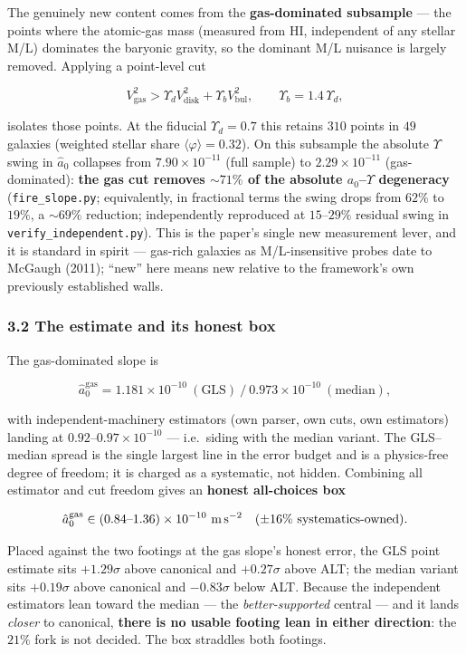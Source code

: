 \documentclass[
]{article}
\begin{document}
The genuinely new content comes from the \textbf{gas-dominated
subsample} --- the points where the atomic-gas mass (measured from HI,
independent of any stellar M/L) dominates the baryonic gravity, so the
dominant M/L nuisance is largely removed. Applying a point-level cut

\[V_\mathrm{gas}^2 > \Upsilon_d V_\mathrm{disk}^2 + \Upsilon_b V_\mathrm{bul}^2,\qquad \Upsilon_b=1.4\,\Upsilon_d,\]

isolates those points. At the fiducial \(\Upsilon_d=0.7\) this retains
\(310\) points in \(49\) galaxies (weighted stellar share
\(\langle\varphi\rangle=0.32\)). On this subsample the absolute
\(\Upsilon\) swing in \(\hat a_0\) collapses from \(7.90\times10^{-11}\)
(full sample) to \(2.29\times10^{-11}\) (gas-dominated): \textbf{the gas
cut removes \(\sim71\%\) of the absolute \(a_0\)--\(\Upsilon\)
degeneracy} (\texttt{fire\_slope.py}; equivalently, in fractional terms
the swing drops from \(62\%\) to \(19\%\), a \(\sim69\%\) reduction;
independently reproduced at \(15\)--\(29\%\) residual swing in
\texttt{verify\_independent.py}). This is the paper's single new
measurement lever, and it is standard in spirit --- gas-rich galaxies as
M/L-insensitive probes date to McGaugh (2011); ``new'' here means new
relative to the framework's own previously established walls.

\subsubsection{3.2 The estimate and its honest
box}\label{the-estimate-and-its-honest-box}

The gas-dominated slope is

\[\hat a_0^\mathrm{gas}=1.181\times10^{-10}\ (\text{GLS})\ /\ 0.973\times10^{-10}\ (\text{median}),\]

with independent-machinery estimators (own parser, own cuts, own
estimators) landing at \(0.92\)--\(0.97\times10^{-10}\) --- i.e.~siding
with the median variant. The GLS--median spread is the single largest
line in the error budget and is a physics-free degree of freedom; it is
charged as a systematic, not hidden. Combining all estimator and cut
freedom gives an \textbf{honest all-choices box}

\[\hat a_0^\mathrm{gas}\in(0.84\text{–}1.36)\times10^{-10}\ {\rm m\,s^{-2}}\quad(\pm16\%\ \text{systematics-owned}).\]

Placed against the two footings at the gas slope's honest error, the GLS
point estimate sits \(+1.29\sigma\) above canonical and \(+0.27\sigma\)
above ALT; the median variant sits \(+0.19\sigma\) above canonical and
\(-0.83\sigma\) below ALT. Because the independent estimators lean
toward the median --- the \emph{better-supported} central --- and it
lands \emph{closer} to canonical, \textbf{there is no usable footing
lean in either direction}: the \(21\%\) fork is not decided. The box
straddles both footings.
\end{document}
